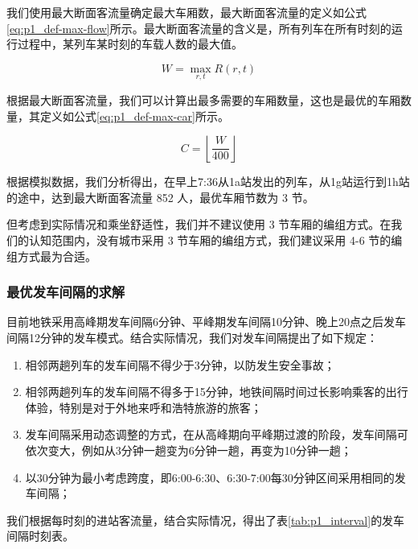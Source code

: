 \documentclass[12pt,a4paper]{mcmthesis}
\begin{document}
        我们使用最大断面客流量确定最大车厢数，最大断面客流量的定义如公式\ref{eq:p1_def-max-flow}所示。最大断面客流量的含义是，所有列车在所有时刻的运行过程中，某列车某时刻的车载人数的最大值。

        \begin{equation}
            W = \max_{r,t} R(r,t)
            \label{eq:p1_def-max-flow}
        \end{equation}

        根据最大断面客流量，我们可以计算出最多需要的车厢数量，这也是最优的车厢数量，其定义如公式\ref{eq:p1_def-max-car}所示。

        \begin{equation}
            C = \left\lfloor \frac{W}{400} \right\rfloor
            \label{eq:p1_def-max-car}
        \end{equation}

        根据模拟数据，我们分析得出，在早上7:36从1a站发出的列车，从1g站运行到1h站的途中，达到最大断面客流量 852 人，最优车厢节数为 3 节。

        但考虑到实际情况和乘坐舒适性，我们并不建议使用 3 节车厢的编组方式。在我们的认知范围内，没有城市采用 3 节车厢的编组方式，我们建议采用 4-6 节的编组方式最为合适。

    \subsubsection{最优发车间隔的求解}

        目前地铁采用高峰期发车间隔6分钟、平峰期发车间隔10分钟、晚上20点之后发车间隔12分钟的发车模式。结合实际情况，我们对发车间隔提出了如下规定：

        \begin{enumerate}
            \item 相邻两趟列车的发车间隔不得少于3分钟，以防发生安全事故；
            \item 相邻两趟列车的发车间隔不得多于15分钟，地铁间隔时间过长影响乘客的出行体验，特别是对于外地来呼和浩特旅游的旅客；
            \item 发车间隔采用动态调整的方式，在从高峰期向平峰期过渡的阶段，发车间隔可依次变大，例如从3分钟一趟变为6分钟一趟，再变为10分钟一趟；
            \item 以30分钟为最小考虑跨度，即6:00-6:30、6:30-7:00每30分钟区间采用相同的发车间隔；
        \end{enumerate}

        我们根据每时刻的进站客流量，结合实际情况，得出了表\ref{tab:p1_interval}的发车间隔时刻表。
\end{document}
